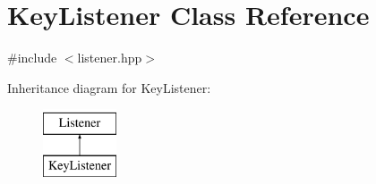 \hypertarget{class_key_listener}{}\section{Key\+Listener Class Reference}
\label{class_key_listener}


{\ttfamily \#include $<$listener.\+hpp$>$}

Inheritance diagram for Key\+Listener\+:\begin{figure}[H]
\begin{center}
\leavevmode
\includegraphics[height=2.000000cm]{class_key_listener}
\end{center}
\end{figure}
